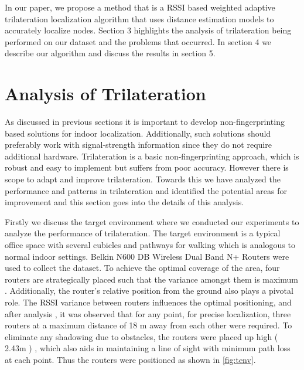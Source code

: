 \documentclass[twocolumn, 11pt]{IEEEtran}
\begin{document}
In our paper, we propose a method that is a RSSI based weighted adaptive trilateration localization algorithm that uses distance estimation models to accurately localize nodes. Section 3 highlights the analysis of trilateration being performed on our dataset and the problems that occurred. In section 4 we describe our algorithm and discuss the results in section 5. 

    

\section{Analysis of Trilateration}


As discussed in previous sections it is important to develop non-fingerprinting based solutions for indoor localization. Additionally, such solutions should preferably work with signal-strength information since they do not require additional hardware. Trilateration is a basic non-fingerprinting approach, which is robust and easy to implement but suffers from poor accuracy. However there is scope to adapt and improve trilateration. Towards this we have analyzed the performance and patterns in trilateration and identified the potential areas for improvement and this section goes into the details of this analysis. 

Firstly we discuss the target environment where we conducted our experiments to analyze the performance of trilateration. The target environment is a typical office space with several cubicles and pathways for walking which is analogous to normal indoor settings. Belkin N600 DB Wireless Dual Band N+ Routers were used to collect the dataset. To achieve the optimal coverage of the area, four routers are strategically placed such that the variance amongst them is maximum \cite{kaemarungsi2012analysis , CiscoLocation}. Additionally, the router's relative position from the ground also plays a pivotal role. The RSSI variance between routers influences the optimal positioning, and after analysis \cite{shanmugaapriyan2014pragmatic} , it was observed that for any point, for precise localization, three routers at a maximum distance of 18 m away from each other were required. To eliminate any shadowing due to obstacles, the routers were placed up high ( 2.43m ) \cite{shanmugaapriyan2014pragmatic}, which also aids in maintaining a line of sight with minimum path loss at each point. Thus the routers were positioned as shown in \ref{fig:tenv}.   
\end{document}
